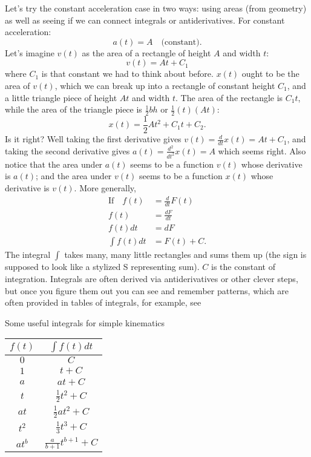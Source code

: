 \documentclass{tufte-handout}
\begin{document}
Let's try the constant acceleration case in two ways: using areas (from geometry) as well as seeing if we can connect integrals or antiderivatives. For constant acceleration:
\begin{equation}
a(t) = A\quad\text{(constant)}.
\end{equation}
Let's imagine $v(t)$ as the area of a rectangle of height $A$ and width $t$:
\begin{equation}
v(t) = A t + C_1
\end{equation}
where $C_1$ is that constant we had to think about before. $x(t)$ ought to be the area of $v(t)$, which we can break up into a rectangle of constant height $C_1$, and a little triangle piece of height $A t$ and width $t$. The area of the rectangle is $C_1 t$, while the area of the triangle piece is $\frac{1}{2} b h$ or $\frac{1}{2} (t) (At)$:
\begin{equation}
x(t) = \frac{1}{2} A t^2 + C_1 t + C_2. 
\end{equation}
Is it right? Well taking the first derivative gives $v(t) = \frac{d}{dt}x(t) = A t + C_1$, and taking the second derivative gives $a(t) = \frac{d^2}{dt^2} x(t) = A$ which seems right. Also notice that the area under $a(t)$ seems to be a function $v(t)$ whose derivative is $a(t)$; and the area under $v(t)$ seems to be a function $x(t)$ whose derivative is $v(t)$. More generally,
\begin{align}
\text{If}\quad f(t) &= \frac{d}{dt} F(t) \\
f(t) &= \frac{dF}{dt} \\
f(t) dt &= dF \\
\int f(t) dt &= F(t) + C.
\end{align}
The integral $\int$ takes many, many little rectangles and sums them up (the sign is supposed to look like a stylized S representing sum). $C$ is the constant of integration.  Integrals are often derived via antiderivatives or other clever steps, but once you figure them out you can see and remember patterns, which are often provided in tables of integrals, for example, see 
\begin{margintable}
\caption{Some useful integrals for simple kinematics}
\label{tab:integrals}
\begin{center}
\small
\begin{tabular}{cc}
\toprule
$f(t)$ & $\int f(t) dt$ \\
\midrule
$0$ & $C$ \\
$1$ & $t + C$ \\
$a$ & $at + C$ \\
$t$ & $\frac{1}{2} t^2 + C$ \\
$at$ & $\frac{1}{2} at^2 + C$ \\
$t^2$ & $\frac{1}{3} t^3 + C$ \\
$a t^b$ & $\frac{a}{b+1} t^{b+1} + C$ \\
\bottomrule
\end{tabular}
\end{center}
\end{margintable}
\end{document}
